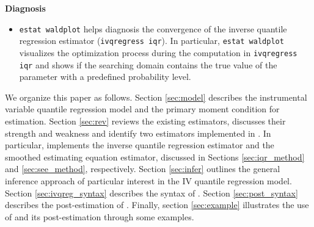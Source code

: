 \begin{description}
\begin{itemize}
    \end{itemize}

   \item{\bf Diagnosis}

     \begin{itemize}
       \item {\tt estat waldplot} helps diagnosis the convergence of the
	 inverse quantile regression estimator ({\tt ivqregress iqr}). In
	 particular, {\tt estat waldplot} visualizes the optimization process
	 during the computation in {\tt ivqregress iqr} and shows if the
	 searching domain contains the true value of the parameter with a
	 predefined probability level.
     \end{itemize}

\end{description}

We organize this paper as follows. Section \ref{sec:model} describes the
instrumental variable quantile regression model and the primary moment condition
for estimation. Section \ref{sec:rev} reviews the existing estimators, discusses
their strength and weakness and identify two estimators implemented in
{\ivqreg}.  In particular, {\ivqreg} implements the inverse quantile regression
estimator and the smoothed estimating equation estimator, discussed in
Sections \ref{sec:iqr_method} and \ref{sec:see_method}, respectively.  Section
\ref{sec:infer} outlines the general inference approach of particular
interest in the IV quantile regression model. Section \ref{sec:ivqreg_syntax}
describes the syntax of {\ivqreg}. Section \ref{sec:post_syntax} describes the
post-estimation of {\ivqreg}. Finally, section \ref{sec:example} illustrates the
use of {\ivqreg} and its post-estimation through some examples. 


